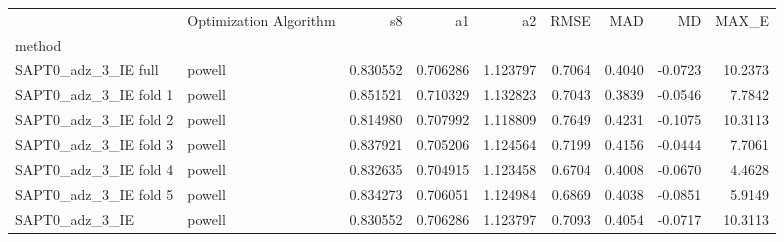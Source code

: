 \begin{tabular}{llrrrrrrr}
 & Optimization Algorithm & s8 & a1 & a2 & RMSE & MAD & MD & MAX_E \\
method &  &  &  &  &  &  &  &  \\
SAPT0_adz_3_IE full & powell & 0.830552 & 0.706286 & 1.123797 & 0.7064 & 0.4040 & -0.0723 & 10.2373 \\
SAPT0_adz_3_IE fold 1 & powell & 0.851521 & 0.710329 & 1.132823 & 0.7043 & 0.3839 & -0.0546 & 7.7842 \\
SAPT0_adz_3_IE fold 2 & powell & 0.814980 & 0.707992 & 1.118809 & 0.7649 & 0.4231 & -0.1075 & 10.3113 \\
SAPT0_adz_3_IE fold 3 & powell & 0.837921 & 0.705206 & 1.124564 & 0.7199 & 0.4156 & -0.0444 & 7.7061 \\
SAPT0_adz_3_IE fold 4 & powell & 0.832635 & 0.704915 & 1.123458 & 0.6704 & 0.4008 & -0.0670 & 4.4628 \\
SAPT0_adz_3_IE fold 5 & powell & 0.834273 & 0.706051 & 1.124984 & 0.6869 & 0.4038 & -0.0851 & 5.9149 \\
SAPT0_adz_3_IE & powell & 0.830552 & 0.706286 & 1.123797 & 0.7093 & 0.4054 & -0.0717 & 10.3113 \\
\end{tabular}
